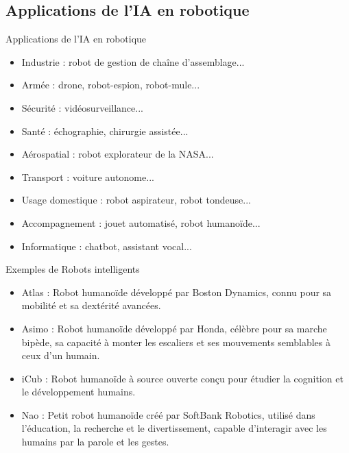 \documentclass{beamer}
\begin{document}
\subsection{Applications de l'IA en robotique}
\begin{frame}{Applications de l'IA en robotique}
    \begin{itemize}
	\item Industrie : robot de gestion de chaîne d'assemblage...
	\item Armée : drone, robot-espion, robot-mule...
	\item Sécurité : vidéosurveillance...
	\item Santé : échographie, chirurgie assistée...
	\item Aérospatial : robot explorateur de la NASA...
	\item Transport : voiture autonome...
	\item Usage domestique : robot aspirateur, robot tondeuse...
	\item Accompagnement : jouet automatisé, robot humanoïde...
	\item Informatique : chatbot, assistant vocal...
\end{itemize}
\end{frame}

\begin{frame}{Exemples de Robots intelligents}
	\begin{itemize}
		\item Atlas : Robot humanoïde développé par Boston Dynamics, connu pour sa mobilité et sa dextérité avancées.
		\item Asimo : Robot humanoïde développé par Honda, célèbre pour sa marche bipède, sa capacité à monter les escaliers et ses mouvements semblables à ceux d'un humain.
		\item iCub : Robot humanoïde à source ouverte conçu pour étudier la cognition et le développement humains.
		\item Nao : Petit robot humanoïde créé par SoftBank Robotics, utilisé dans l'éducation, la recherche et le divertissement, capable d'interagir avec les humains par la parole et les gestes.
	\end{itemize}
\end{frame}


\end{document}
